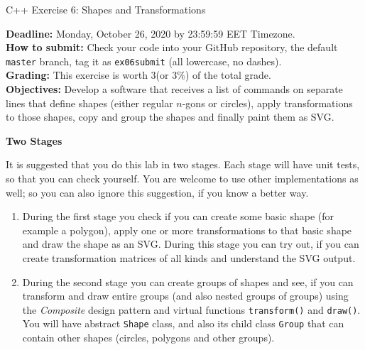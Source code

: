 \documentclass[11pt]{article}
\begin{document}
\thispagestyle{empty}


\begin{center}
{\Large C++ Exercise 6: Shapes and Transformations}
\end{center}



{\bf Deadline:} Monday, October 26, 2020 by 23:59:59 EET Timezone.\\ 
{\bf How to submit:} Check your code into your GitHub repository, 
the default {\tt master} branch, 
tag it as {\tt ex06submit} (all lowercase, no dashes).\\
{\bf Grading:} This exercise is worth 3\textperthousand (or $3\%$) of the total grade.\\
{\bf Objectives:} Develop a software that receives a list of commands on separate lines that define shapes 
(either regular $n$-gons or circles), apply transformations to those shapes, 
copy and group the shapes and finally paint them as SVG.


\vspace{20pt}
{\bf \large Two Stages}

It is suggested that you do this lab in two stages. 
Each stage will have unit tests, so that you can check yourself. 
You are welcome to use other implementations as well; 
so you can also ignore this suggestion, if you know a better way.
 
\begin{enumerate}
\item During the first stage you check if you can create some basic shape 
(for example a polygon), apply one or more transformations to that 
basic shape and draw the shape as an SVG. During this stage you 
can try out, if you can create transformation matrices of all kinds and 
understand the SVG output.
\item During the second stage you can create groups of shapes and see, if 
you can transform and draw entire groups (and also nested groups of groups) 
using the {\em Composite} design pattern and virtual functions
{\tt transform()} and {\tt draw()}.
You will have abstract {\tt Shape} class, and also its child class {\tt Group}
that can contain other shapes (circles, polygons and other groups).  
\end{enumerate}
\end{document}
